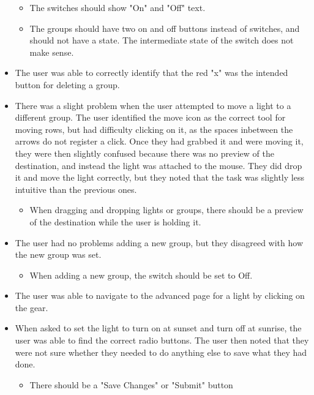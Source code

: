 \documentclass[oneside,openright]{book}
\begin{document}
\begin{itemize}
\begin{itemize}
            \item The switches should show "On" and "Off" text.
            \item The groups should have two on and off buttons instead of
                switches, and should not have a state. The intermediate state
                of the switch does not make sense.
        \end{itemize}
    \item The user was able to correctly identify that the red "x" was the
        intended button for deleting a group.
    \item There was a slight problem when the user attempted to move a light to
        a different group. The user identified the move icon as the correct
        tool for moving rows, but had difficulty clicking on it, as the spaces
        inbetween the arrows do not register a click. Once they had grabbed it
        and were moving it, they were then slightly confused because there was
        no preview of the destination, and instead the light was attached to
        the mouse. They did drop it and move the light correctly, but they
        noted that the task was slightly less intuitive than the previous ones.
        \begin{itemize}
            \item When dragging and dropping lights or groups, there should be
                a preview of the destination while the user is holding it.
        \end{itemize}
    \item The user had no problems adding a new group, but they disagreed with
        how the new group was set.
        \begin{itemize}
            \item When adding a new group, the switch should be set to Off.
        \end{itemize}
    \item The user was able to navigate to the advanced page for a light by
        clicking on the gear.
    \item When asked to set the light to turn on at sunset and turn off at
        sunrise, the user was able to find the correct radio buttons. The user
        then noted that they were not sure whether they needed to do anything
        else to save what they had done.
        \begin{itemize}
            \item There should be a "Save Changes" or "Submit" button
        \end{itemize}

\end{itemize}
\end{document}
